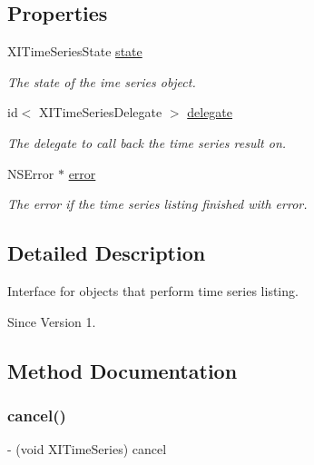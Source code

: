 \subsection*{Properties}
\begin{DoxyCompactItemize}
\item 
X\+I\+Time\+Series\+State \hyperlink{protocol_x_i_time_series_01-p_a069ed984107bc2fb781ca7c09629a855}{state}
\begin{DoxyCompactList}\small\item\em The state of the ime series object. \end{DoxyCompactList}\item 
id$<$ X\+I\+Time\+Series\+Delegate $>$ \hyperlink{protocol_x_i_time_series_01-p_ab1a82e0bb55e940d962d8633b4609a48}{delegate}
\begin{DoxyCompactList}\small\item\em The delegate to call back the time series result on. \end{DoxyCompactList}\item 
N\+S\+Error $\ast$ \hyperlink{protocol_x_i_time_series_01-p_a17dae744d476350328a52d2a65e10708}{error}
\begin{DoxyCompactList}\small\item\em The error if the time series listing finished with error. \end{DoxyCompactList}\end{DoxyCompactItemize}


\subsection{Detailed Description}
Interface for objects that perform time series listing. 

\begin{DoxySince}{Since}
Version 1. 
\end{DoxySince}


\subsection{Method Documentation}
\hypertarget{protocol_x_i_time_series_01-p_a0835de2f42cac50f6e0da9af775047c2}{}\label{protocol_x_i_time_series_01-p_a0835de2f42cac50f6e0da9af775047c2} 
\subsubsection{\texorpdfstring{cancel()}{cancel()}}
{\footnotesize\ttfamily -\/ (void X\+I\+Time\+Series) cancel \begin{DoxyParamCaption}{ }\end{DoxyParamCaption}}



